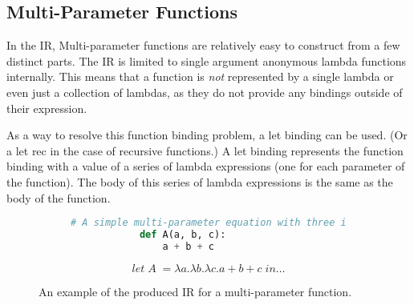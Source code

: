 \documentclass{l4proj}
\begin{document}
\subsection*{Multi-Parameter Functions}

In the IR, Multi-parameter functions are relatively easy to construct from a few distinct parts.
The IR is limited to single argument anonymous lambda functions internally.
This means that a function is \emph{not} represented by a single lambda or even just a collection of lambdas, as they do not provide any bindings outside of their expression.

As a way to resolve this function binding problem, a let binding can be used. (Or a let rec in the case of recursive functions.)
A let binding represents the function binding with a value of a series of lambda expressions (one for each parameter of the function).
The body of this series of lambda expressions is the same as the body of the function.

\begin{figure}[H]
    \begin{subfigure}{0.45\textwidth}
        \begin{center}
            \begin{lstlisting}[language=Python, keepspaces=true]
            # A simple multi-parameter equation with three inputs.
            def A(a, b, c):
                a + b + c
            \end{lstlisting}
        \end{center}
    \end{subfigure}
    \begin{subfigure}{0.45\textwidth}
        \begin{center}
            \begin{equation*}
                let \; A \; = \lambda a . \lambda b. \lambda c. a + b + c \; in \dots
            \end{equation*}
        \end{center}
    \end{subfigure}
    \caption{An example of the produced IR for a multi-parameter function.}
    \label{fig:function-to-ir}
\end{figure}

\end{document}
